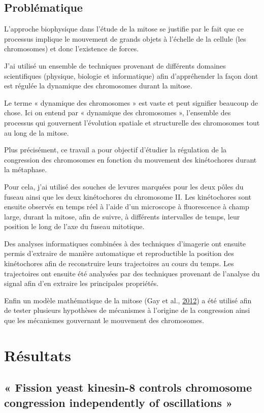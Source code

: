 \documentclass[12pt,a4paper,twoside,openright]{book}
\begin{document}
\section{Problématique}\label{probluxe9matique}

L'approche biophysique dans l'étude de la mitose se justifie par le fait
que ce processus implique le mouvement de grands objets à l'échelle de
la cellule (les chromosomes) et donc l'existence de forces.

J'ai utilisé un ensemble de techniques provenant de différents domaines
scientifiques (physique, biologie et informatique) afin d'appréhender la
façon dont est régulée la dynamique des chromosomes durant la mitose.

Le terme « dynamique des chromosomes » est vaste et peut signifier
beaucoup de chose. Ici on entend par « dynamique des chromosomes »,
l'ensemble des processus qui gouvernent l'évolution spatiale et
structurelle des chromosomes tout au long de la mitose.

Plus précisément, ce travail a pour objectif d'étudier la régulation de
la congression des chromosomes en fonction du mouvement des kinétochores
durant la métaphase.

Pour cela, j'ai utilisé des souches de levures marquées pour les deux
pôles du fuseau ainsi que les deux kinétochores du chromosome II. Les
kinétochores sont ensuite observés en temps réel à l'aide d'un
microscope à fluorescence à champ large, durant la mitose, afin de
suivre, à différents intervalles de temps, leur position le long de
l'axe du fuseau mitotique.

Des analyses informatiques combinées à des techniques d'imagerie ont
ensuite permis d'extraire de manière automatique et reproductible la
position des kinétochores afin de reconstruire leurs trajectoires au
cours du temps. Les trajectoires ont ensuite été analysées par des
techniques provenant de l'analyse du signal afin d'en extraire les
principales propriétés.

Enfin un modèle mathématique de la mitose (Gay et al.,
\hyperref[ref-Gay2012a]{2012}) a été utilisé afin de tester plusieurs
hypothèses de mécanismes à l'origine de la congression ainsi que les
mécanismes gouvernant le mouvement des chromosomes.

\chapter{Résultats}\label{ruxe9sultats}

\section{« Fission yeast kinesin-8 controls chromosome congression
independently of oscillations »}\label{sec:article}
\end{document}
